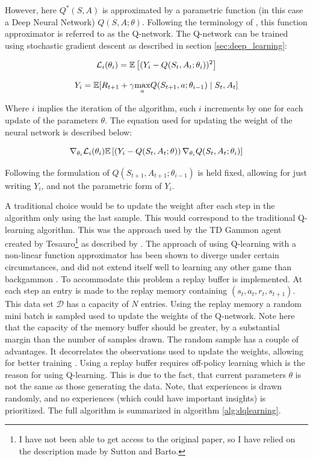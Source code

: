 However, here $Q^*(S, A)$ is approximated by a parametric function (in this case a Deep Neural Network) $Q(S, A ; \theta)$. Following the terminology of \textcite{mnih_playing_2013}, this function approximator is referred to as the Q-network. The Q-network can be trained using stochastic gradient descent as described in section \ref{sec:deep_learning}:

\begin{equation}
    \mathcal{L}_i(\theta_i) = \mathbb{E} \left[ (Y_i - Q(S_t, A_t ; \theta_i))^2 \right]
\end{equation}

\begin{equation}
    Y_i = \mathbb{E} [R_{t+1} + \gamma \underset{a}\max Q(S_{t+1}, a; \theta_{i-1}) \mid S_t, A_t ]
\end{equation}

Where $i$ implies the iteration of the algorithm, such $i$ increments by one for each update of the parameters $\theta$. The equation used for updating the weight of the neural network is described below:

\begin{equation}
    \nabla_{\theta_i} \mathcal{L}_i (\theta_i)  \mathbb{E} \left[ \left( Y_i - Q(S_t, A_t ; \theta) \right) \nabla_{\theta_i} Q(S_t, A_t; \theta_i) \right]
\end{equation}

Following the formulation of \textcite{mnih_playing_2013} $Q(S_{t+1}, A_{t+1}; \theta_{i-1})$ is held fixed, allowing for just writing $Y_i$, and not the parametric form of $Y_i$.

A traditional choice would be to update the weight after each step in the algorithm only using the last sample. This would correspond to the traditional Q-learning algorithm. This was the approach used by the TD Gammon agent created by Tesauro\footnote{I have not been able to get access to the original paper, so I have relied on the description made by Sutton and Barto.} as described by \textcite{sutton_reinforcement_2018}. The approach of using Q-learning with a non-linear function approximator has been shown to diverge under certain circumstances, and did not extend itself well to learning any other game than backgammon \parencite{tsitsiklis_analysis_1997}. To accommodate this problem a replay buffer is implemented. At each step an entry is made to the replay memory containing $(s_t, a_t, r_t, s_{t+1})$. This data set $\mathcal{D}$ has a capacity of $N$ entries. Using the replay memory a random mini batch is sampled used to update the weights of the Q-network. Note here that the capacity of the memory buffer should be greater, by a substantial margin than the number of samples drawn. The random sample has a couple of advantages. It decorrelates the observations used to update the weights, allowing for better training \textcite{mnih_playing_2013}. Using a replay buffer requires off-policy learning which is the reason for using Q-learning. This is due to the fact, that current parameters $\theta$ is not the same as those generating the data. Note, that experiences is drawn randomly, and no experiences (which could have important insights) is prioritized. The full algorithm is summarized in algorithm \ref{alg:dqlearning}.


